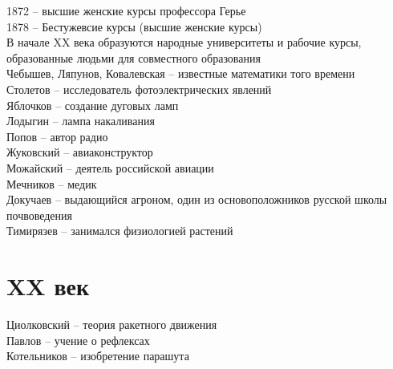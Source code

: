 \documentclass[12pt]{article}
\begin{document}
1872 -- высшие женские курсы профессора Герье\\
1878 -- Бестужевсие курсы (высшие женские курсы)\\
В начале XX века образуются народные университеты и рабочие курсы, образованные людьми для совместного образования\\
Чебышев, Ляпунов, Ковалевская -- известные математики того времени\\
Столетов -- исследователь фотоэлектрических явлений\\
Яблочков -- создание дуговых ламп\\
Лодыгин -- лампа накаливания\\
Попов -- автор радио\\
Жуковский -- авиаконструктор\\
Можайский -- деятель российской авиации\\
Мечников -- медик\\
Докучаев -- выдающийся агроном, один из основоположников русской школы почвоведения\\
Тимирязев -- занимался физиологией растений
\section*{XX век}
Циолковский -- теория ракетного движения\\
Павлов -- учение о рефлексах\\
Котельников -- изобретение парашута
\end{document}
